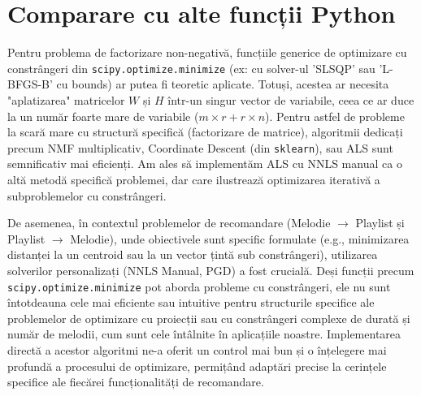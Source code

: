 \documentclass[12pt,a4paper]{article}
\begin{document}
	\section{Comparare cu alte funcții Python}
	Pentru problema de factorizare non-negativă, funcțiile generice de optimizare cu constrângeri din \texttt{scipy.optimize.minimize} (ex: cu solver-ul 'SLSQP' sau 'L-BFGS-B' cu bounds) ar putea fi teoretic aplicate. Totuși, acestea ar necesita "aplatizarea" matricelor $W$ și $H$ într-un singur vector de variabile, ceea ce ar duce la un număr foarte mare de variabile ($m \times r + r \times n$). Pentru astfel de probleme la scară mare cu structură specifică (factorizare de matrice), algoritmii dedicați precum NMF multiplicativ, Coordinate Descent (din \texttt{sklearn}), sau ALS sunt semnificativ mai eficienți. Am ales să implementăm ALS cu NNLS manual ca o altă metodă specifică problemei, dar care ilustrează optimizarea iterativă a subproblemelor cu constrângeri.

	De asemenea, în contextul problemelor de recomandare (Melodie $\rightarrow$ Playlist și Playlist $\rightarrow$ Melodie), unde obiectivele sunt specific formulate (e.g., minimizarea distanței la un centroid sau la un vector țintă sub constrângeri), utilizarea solverilor personalizați (NNLS Manual, PGD) a fost crucială. Deși funcții precum \texttt{scipy.optimize.minimize} pot aborda probleme cu constrângeri, ele nu sunt întotdeauna cele mai eficiente sau intuitive pentru structurile specifice ale problemelor de optimizare cu proiecții sau cu constrângeri complexe de durată și număr de melodii, cum sunt cele întâlnite în aplicațiile noastre. Implementarea directă a acestor algoritmi ne-a oferit un control mai bun și o înțelegere mai profundă a procesului de optimizare, permițând adaptări precise la cerințele specifice ale fiecărei funcționalități de recomandare.
\end{document}
